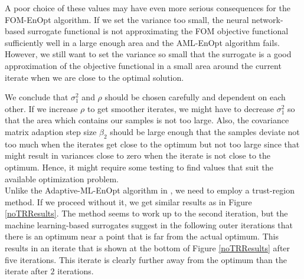 A poor choice of these values may have even more serious consequences for the FOM-EnOpt algorithm. If we set the variance too small, the neural network-based surrogate functional is not approximating the FOM objective functional sufficiently well in a large enough area and the AML-EnOpt algorithm fails. However, we still want to set the variance so small that the surrogate is a good approximation of the objective functional in a small area around the current iterate when we are close to the optimal solution.

We conclude that $\sigma^2_1$ and $\rho$ should be chosen carefully and dependent on each other. If we increase $\rho$ to get smoother iterates, we might have to decrease $\sigma^2_1$ so that the area which contains our samples is not too large. Also, the covariance matrix adaption step size $\beta_2$ should be large enough that the samples deviate not too much when the iterates get close to the optimum but not too large since that might result in variances close to zero when the iterate is not close to the optimum. Hence, it might require some testing to find values that suit the available optimization problem.\\

Unlike the Adaptive-ML-EnOpt algorithm in \cite{Keil2022-dj}, we need to employ a trust-region method. If we proceed without it, we get similar results as in Figure \ref{noTRResults}. The method seems to work up to the second iteration, but the machine learning-based surrogates suggest in the following outer iterations that there is an optimum near a point that is far from the actual optimum. This results in an iterate that is shown at the bottom of Figure \ref{noTRResults} after five iterations. This iterate is clearly further away from the optimum than the iterate after $2$ iterations.\\

